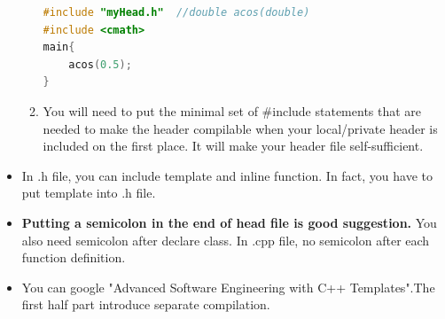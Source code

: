 \documentclass[a4paper,11pt,twoside]{book}
\begin{document}
\begin{itemize}
\begin{enumerate}
\begin{lstlisting}[frame=single, language=c++]
#include "myHead.h"  //double acos(double)
#include <cmath>
main{
	acos(0.5);
}
\end{lstlisting}
		
		\item You will need to put the minimal set of \#include statements that are needed to make the header compilable when your local/private header is included on the first place.  It will make your header file self-sufficient.
	\end{enumerate}
	
	\item In .h file, you can include template and inline function.  In fact, you have to put template into .h file. 
	
	\item \textbf{Putting a semicolon in the end of head file is good suggestion.} You also need semicolon after declare class. In .cpp file, no semicolon after each function definition.
	
	\item You can google "Advanced Software Engineering with C++ Templates".The first half part introduce separate compilation.
\end{itemize}
\end{document}
